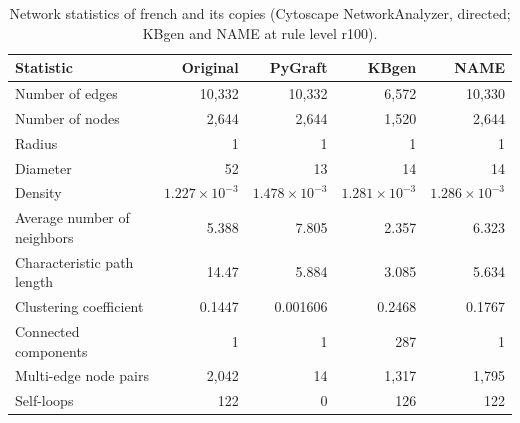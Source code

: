 \begin{table}[t]
\centering
\caption{Network statistics of french and its copies (Cytoscape NetworkAnalyzer, directed; KBgen and NAME at rule level r100).}
\label{tab:cytoscape_french}
\begin{tabular}{lrrrr}
\toprule
Statistic & Original & PyGraft & KBgen & NAME \\
\midrule
Number of edges & 10{,}332 & 10{,}332 & 6{,}572 & 10{,}330 \\
Number of nodes & 2{,}644 & 2{,}644 & 1{,}520 & 2{,}644 \\
Radius & 1 & 1 & 1 & 1 \\
Diameter & 52 & 13 & 14 & 14 \\
Density & $1.227\times10^{-3}$ & $1.478\times10^{-3}$ & $1.281\times10^{-3}$ & $1.286\times10^{-3}$ \\
Average number of neighbors & 5.388 & 7.805 & 2.357 & 6.323 \\
Characteristic path length & 14.47 & 5.884 & 3.085 & 5.634 \\
Clustering coefficient & 0.1447 & 0.001606 & 0.2468 & 0.1767 \\
Connected components & 1 & 1 & 287 & 1 \\
Multi-edge node pairs & 2{,}042 & 14 & 1{,}317 & 1{,}795 \\
Self-loops & 122 & 0 & 126 & 122 \\
\bottomrule
\end{tabular}
\end{table}
